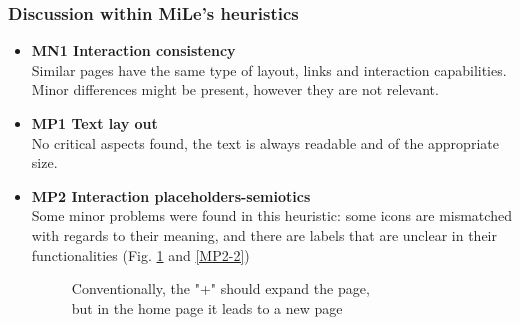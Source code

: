 \subsubsection{Discussion within MiLe's heuristics}
\begin{itemize}
    \item \textbf{MN1 Interaction consistency}\\
    Similar pages have the same type of layout, links and interaction capabilities. Minor differences might be present, however they are not relevant.
    \item \textbf{MP1 Text lay out}\\
        No critical aspects found, the text is always readable and of the appropriate size.\\
    \item \textbf{MP2 Interaction placeholders-semiotics}\\
        Some minor problems were found in this heuristic: some icons are mismatched with regards to their meaning, and there are labels that are unclear in their functionalities (Fig. \ref{MP2-1} and \ref{MP2-2})
        \begin{figure}[!ht]
            \begin{minipage}{\linewidth}
                \centering
                \captionsetup{justification=centering}
                \caption{Conventionally, the "+" should expand the page,\\
                but in the home page it leads to a new page}
                \label{MP2-1}
            \end{minipage}
        \end{figure}
        \begin{figure}[!ht]
            \begin{minipage}{\linewidth}
                \centering

\end{minipage}
\end{figure}
\end{itemize}

